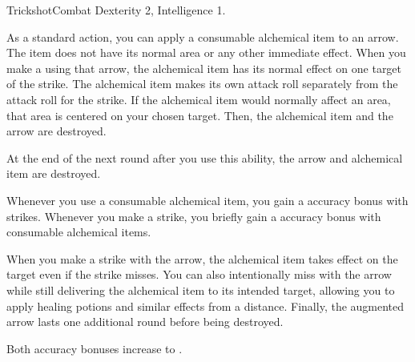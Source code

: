   \begin{feat}{Trickshot}{Combat}
    \featpre Dexterity 2, Intelligence 1.

     As a standard action, you can apply a consumable alchemical item to an arrow.
    The item does not have its normal area or any other immediate effect.
    When you make a  using that arrow, the alchemical item has its normal effect on one target of the strike.
    The alchemical item makes its own attack roll separately from the attack roll for the strike.
    If the alchemical item would normally affect an area, that area is centered on your chosen target.
    Then, the alchemical item and the arrow are destroyed.

    At the end of the next round after you use this ability, the arrow and alchemical item are destroyed.

     Whenever you use a consumable alchemical item, you  gain a  accuracy bonus with strikes.
    Whenever you make a strike, you briefly gain a  accuracy bonus with consumable alchemical items.

     When you make a strike with the arrow, the alchemical item takes effect on the target even if the strike misses.
    You can also intentionally miss with the arrow while still delivering the alchemical item to its intended target, allowing you to apply healing potions and similar effects from a distance.
    Finally, the augmented arrow lasts one additional round before being destroyed.

     Both accuracy bonuses increase to .
  \end{feat}

